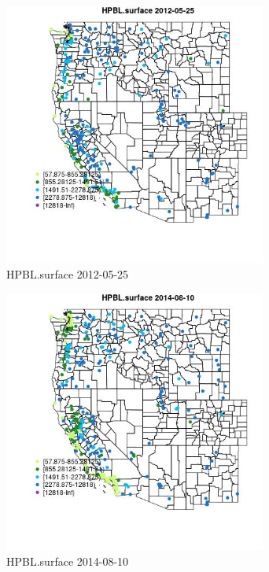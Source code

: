 \begin{figure} 
\centering  
\includegraphics[width=0.77\textwidth]{Code_Outputs/Report_ML_input_PM25_Step4_part_e_de_duplicated_aves_compiled_2019-05-18wNAs_MapObsHPBLsurface2012-05-25.jpg} 
\caption{\label{fig:Report_ML_input_PM25_Step4_part_e_de_duplicated_aves_compiled_2019-05-18wNAsMapObsHPBLsurface2012-05-25}HPBL.surface 2012-05-25} 
\end{figure} 
 

\begin{figure} 
\centering  
\includegraphics[width=0.77\textwidth]{Code_Outputs/Report_ML_input_PM25_Step4_part_e_de_duplicated_aves_compiled_2019-05-18wNAs_MapObsHPBLsurface2014-08-10.jpg} 
\caption{\label{fig:Report_ML_input_PM25_Step4_part_e_de_duplicated_aves_compiled_2019-05-18wNAsMapObsHPBLsurface2014-08-10}HPBL.surface 2014-08-10} 
\end{figure} 
 

